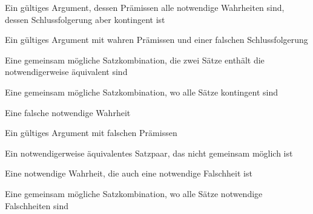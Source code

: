 \begin{earg}
\item Ein gültiges Argument, dessen Prämissen alle notwendige Wahrheiten sind, dessen Schlussfolgerung aber kontingent ist
\item Ein gültiges Argument mit wahren Prämissen und einer falschen Schlussfolgerung
\item Eine gemeinsam mögliche Satzkombination, die zwei Sätze enthält die notwendigerweise äquivalent sind
\item Eine gemeinsam mögliche Satzkombination, wo alle Sätze kontingent sind
\item Eine falsche notwendige Wahrheit
\item Ein gültiges Argument mit falschen Prämissen
\item Ein notwendigerweise äquivalentes Satzpaar, das nicht gemeinsam möglich ist
\item Eine notwendige Wahrheit, die auch eine notwendige Falschheit ist
\item Eine gemeinsam mögliche Satzkombination, wo alle Sätze notwendige Falschheiten sind
\end{earg}
